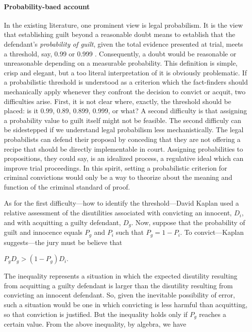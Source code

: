\documentclass[10pt]{article}
\begin{document}
\paragraph{Probability-baed account}

In the existing literature, one prominent view is legal probabilism. It is the view that establishing guilt beyond a reasonable doubt means to establish that the defendant's \textit{probability of guilt}, given the total evidence presented at trial, meets a threshold, say, 0.99 or 0.999  \citep{Kaplan1968Decision, Kaye1999Clarifying-the-, Tillers2007}. Consequently, a doubt would be reasonable or unreasonable depending on a measurable probability.  This definition is simple, crisp and elegant, but a too literal interpretation of it is obviously problematic.  If a probabilistic threshold is understood as a criterion which the fact-finders should mechanically apply whenever they confront the decision to convict or acquit, two difficulties arise. First, it is not clear where, exactly, the threshold should be placed: is it 0.99, 0.89, 0.899, 0.999, or what? A second difficulty is that assigning a probability value to guilt itself might not be feasible. The second difficuly can be sidestepped if we understand legal probabilism less mechanistically.  The legal probabilists can defend their proposal by conceding that they are not offering a recipe that should be directly implementable in court. Assigning probabilities to propositions, they could say, is an idealized process, a regulative ideal which can improve trial proceedings. In this spirit, setting a probabilistic criterion for criminal convictions would only be a way to theorize about the meaning and function of the criminal standard of proof.

As for the first difficulty---how to identify the threshold---David Kaplan used a relative assessment 
of the disutilities associated with convicting an innocent, $D_i$, and with acquitting a guilty defendant, $D_g$.  
Now, suppose that the probability of guilt 
and innocence equals $P_g$ and $P_i$ such that $P_g = 1 - P_i$. 
To convict---Kaplan suggests---the jury must be believe that 

\vspace{2mm}

$P_g D_g > (1-P_g) D_i$.

\vspace{2mm}
\noindent
The inequality represents a situation in which the expected disutility resulting 
from acquitting a guilty defendant is larger than the disutility resulting from 
convicting an innocent defendant. So, given the inevitable possibility of error, such a situation would be one in which 
convicting is less harmful than acquitting, so that conviction is justified.
But the inequality holds only if $P_g$ reaches a certain value. 
From the above inequality, by algebra, we have
\end{document}
